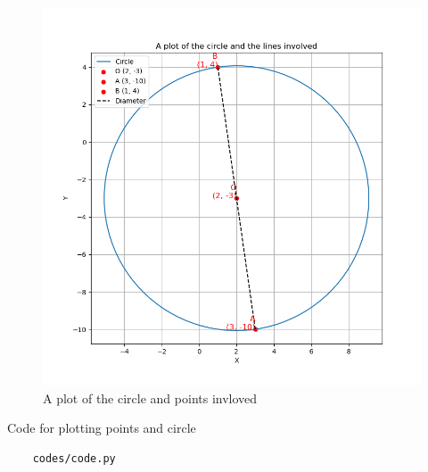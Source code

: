 \documentclass[journal]{IEEEtran}
\begin{document}
\begin{figure}[H]
	\centering
	\includegraphics[width=0.75\columnwidth]{figures/Figure.png}
	\caption{A plot of the circle and points invloved}
	\label{fig}
\end{figure}

Code for plotting points and circle
\begin{lstlisting}
	codes/code.py
\end{lstlisting}

\renewcommand{\thefigure}{\theenumi}
\renewcommand{\thetable}{\theenumi}
\end{document}
